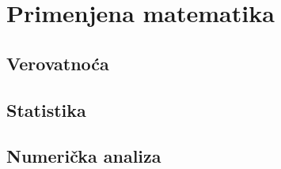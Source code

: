 \documentclass[a4paper,12pt,twoside]{report}
\numberwithin{algorithm}{section}
\begin{document}

\part{Primenjena matematika}

\chapter{Verovatnoća}

\chapter{Statistika}

\chapter{Numerička analiza}
\newpage
\end{document}

